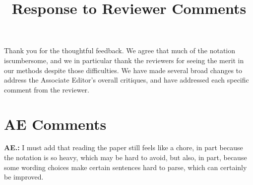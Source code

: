 \documentclass[letterpaper, parskip]{scrartcl}
\newcommand{\pointRaised}[2]{%
	\textbf{#1.\theresponsectr:} #2
}
\newcounter{responsectr}[section]     %
\begin{document}

	\title{Response to Reviewer Comments}
	\maketitle
	
Thank you for the thoughtful feedback. We agree that much of the notation iscumbersome, and we in particular thank the reviewers for seeing the merit in our methods despite those difficulties.  We have made several broad changes to address the Associate Editor's overall critiques, and have addressed each specific comment from the reviewer.

\section{AE Comments}

\pointRaised{AE}{I must add that reading the paper still feels like a chore, in part because the notation is so heavy, which may be hard to avoid, but also, in part, because some wording choices make certain sentences hard to parse, which can certainly be improved.}
\end{document}
